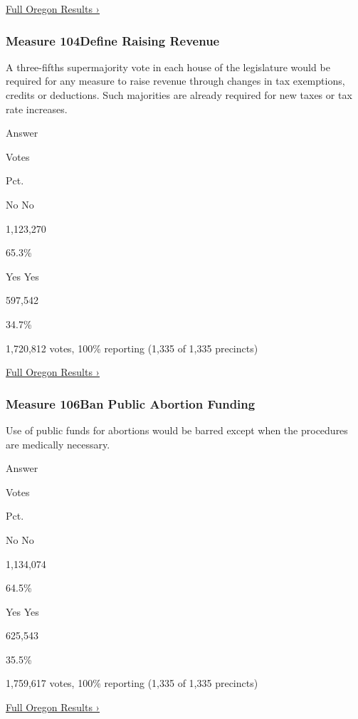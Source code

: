 \href{https://www.nytimes3xbfgragh.onion/interactive/2018/11/06/us/elections/results-oregon-elections.html}{Full
Oregon Results ›}

\hypertarget{measure-104define-raising-revenue}{%
\subsubsection{Measure 104Define Raising
Revenue}\label{measure-104define-raising-revenue}}

A three-fifths supermajority vote in each house of the legislature would
be required for any measure to raise revenue through changes in tax
exemptions, credits or deductions. Such majorities are already required
for new taxes or tax rate increases.

Answer

Votes

Pct.

 No No

1,123,270

65.3\%

 Yes Yes

597,542

34.7\%

1,720,812 votes, 100\% reporting (1,335 of 1,335 precincts)

\href{https://www.nytimes3xbfgragh.onion/interactive/2018/11/06/us/elections/results-oregon-elections.html}{Full
Oregon Results ›}

\hypertarget{measure-106ban-public-abortion-funding}{%
\subsubsection{Measure 106Ban Public Abortion
Funding}\label{measure-106ban-public-abortion-funding}}

Use of public funds for abortions would be barred except when the
procedures are medically necessary.

Answer

Votes

Pct.

 No No

1,134,074

64.5\%

 Yes Yes

625,543

35.5\%

1,759,617 votes, 100\% reporting (1,335 of 1,335 precincts)

\href{https://www.nytimes3xbfgragh.onion/interactive/2018/11/06/us/elections/results-oregon-elections.html}{Full
Oregon Results ›}

